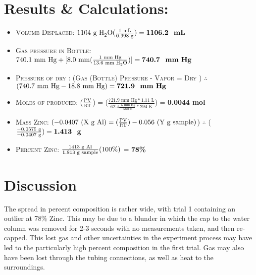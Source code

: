 \documentclass[11pt,letterpaper]{report}
\begin{document}
\section*{Results \& Calculations:}
\begin{itemize}
\item \textsc{Volume Displaced:} $1104 \text{ g \ce{H2O}} (\frac{\text{1 mL}}{\text{0.998 g}}) = \textbf{1106.2 \text{ mL}}$ \\[-0.5cm]
\item \textsc{Gas pressure in Bottle:} $740.1 \text{ mm Hg} + [8.0 \text{ mm} (\frac{1 \text{ mm Hg}}{13.6 \text{ mm \ce{H2O}}})] = \textbf{740.7 \text{ mm Hg}}$ \\[-0.5cm]
\item \textsc{Pressure of dry :} (\textsc{Gas (Bottle) Pressure -  Vapor = Dry }) $\therefore$ $(740.7 \text{ mm Hg} - 18.8 \text{ mm Hg}) = \textbf{721.9 \text{ mm Hg}}$ \\[-0.5cm]
\item \textsc{Moles of  produced:} ($\frac{\textsc{PV}}{\textsc{RT}}$) = ($\frac{721.9 \text{ mm Hg} * 1.11 \text{ L}}{62.4 \frac{\text{ L mm Hg}}{\text{ Mol K}} * 294 \text{ K} }$)  = \textbf{0.0044 mol } \\[-0.5cm]
\item \textsc{Mass Zinc:} $(-0.0407 \text{ (X g \ce{Al})} =  (\frac{\textsc{PV}}{\textsc{RT}}) - 0.056 \text{ (Y g sample)}$) $\therefore$ ($ \frac{-0.0575 \text{ g}}{-0.0407 \text{ g}}) = \textbf{1.413 \text{ g}}$ \\[-0.5cm]
\item \textsc{Percent Zinc:} $\frac{1413 \text{ g \ce{Al}}}{1.813 \text{ g sample}}(100 \%)$ = \textbf{78\%} \\[-0.5cm]
\end{itemize}

\section*{Discussion}

The spread in percent composition is rather wide, with trial 1 containing an outlier at 78\% Zinc.  This may be due to a blunder in which the cap to the water column was removed for 2-3 seconds with no measurements taken, and then re-capped. This lost gas and other uncertainties in the experiment process may have led to the particularly high percent composition in the first trial. Gas may also have been lost through the tubing connections, as well as heat to the surroundings. 
\end{document}
